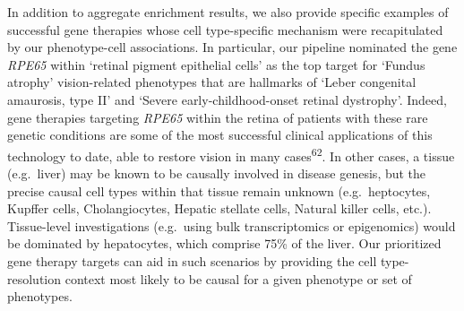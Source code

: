 \documentclass[
]{article}
\begin{document}
In addition to aggregate enrichment results, we also provide specific
examples of successful gene therapies whose cell type-specific mechanism
were recapitulated by our phenotype-cell associations. In particular,
our pipeline nominated the gene \emph{RPE65} within `retinal pigment
epithelial cells' as the top target for `Fundus atrophy' vision-related
phenotypes that are hallmarks of `Leber congenital amaurosis, type II'
and `Severe early-childhood-onset retinal dystrophy'. Indeed, gene
therapies targeting \emph{RPE65} within the retina of patients with
these rare genetic conditions are some of the most successful clinical
applications of this technology to date, able to restore vision in many
cases\textsuperscript{62}. In other cases, a tissue (e.g.~liver) may be
known to be causally involved in disease genesis, but the precise causal
cell types within that tissue remain unknown (e.g.~heptocytes, Kupffer
cells, Cholangiocytes, Hepatic stellate cells, Natural killer cells,
etc.). Tissue-level investigations (e.g.~using bulk transcriptomics or
epigenomics) would be dominated by hepatocytes, which comprise 75\% of
the liver. Our prioritized gene therapy targets can aid in such
scenarios by providing the cell type-resolution context most likely to
be causal for a given phenotype or set of phenotypes.
\end{document}
